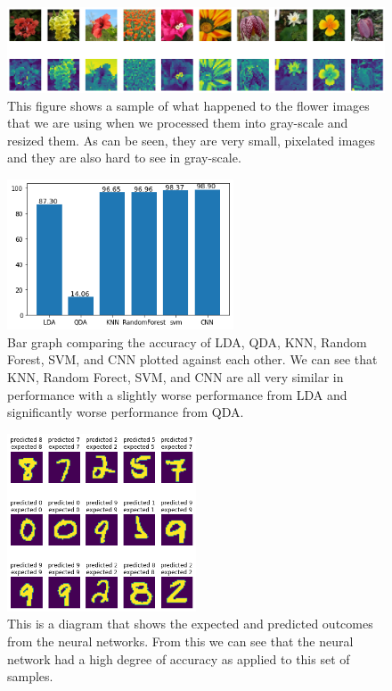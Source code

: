 \documentclass{article}
\begin{document}
\begin{figure}
  \centering
  \includegraphics[width=1\textwidth]{FlowerData.png}
  \caption{This figure shows a sample of what happened to the flower images that we are using when we processed them into gray-scale and resized them. As can be seen, they are very small, pixelated images and they are also hard to see in gray-scale.}
  \label{fig:FlowerDataSet}
\end{figure} 
\begin{figure}
  \centering
  \includegraphics[width=0.6\textwidth]{NumPlot1.png}
  \caption{Bar graph comparing the accuracy of LDA, QDA, KNN, Random Forest, SVM, and CNN plotted against each other. We can see that KNN, Random Forect, SVM, and CNN are all very similar in performance with a slightly worse performance from LDA and significantly worse performance from QDA.}
  \label{fig:NumPlot1}
\end{figure}
\begin{figure}
  \centering
  \includegraphics[width=0.50\textwidth]{NumPlot2.png}
  \caption{This is a diagram that shows the expected and predicted outcomes from the neural networks. From this we can see that the neural network had a high degree of accuracy as applied to this set of samples.}
  \label{fig:NumPlot2}
\end{figure}
\end{document}
